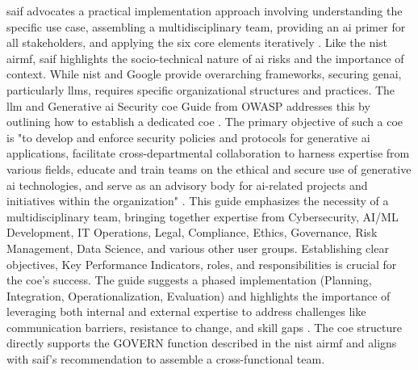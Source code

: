 \gls{saif} advocates a practical implementation approach involving understanding the specific use case, assembling a multidisciplinary team, providing an \gls{ai} primer for all stakeholders, and applying the six core elements iteratively \cite{hansen_introducing_2023}. Like the \gls{nist} \gls{airmf}, \gls{saif} highlights the socio-technical nature of \gls{ai} risks and the importance of context.
While \gls{nist} and Google provide overarching frameworks, securing \gls{genai}, particularly \glspl{llm}, requires specific organizational structures and practices. The \gls{llm} and Generative \gls{ai} Security \gls{coe} Guide from OWASP addresses this by outlining how to establish a dedicated \gls{coe} \cite{editor_llm_nodate-1}. The primary objective of such a \gls{coe} is "to develop and enforce security policies and protocols for generative \gls{ai} applications, facilitate cross-departmental collaboration to harness expertise from various fields, educate and train teams on the ethical and secure use of generative \gls{ai} technologies, and serve as an advisory body for \gls{ai}-related projects and initiatives within the organization" \cite[p.4]{editor_llm_nodate-1}. This guide emphasizes the necessity of a multidisciplinary team, bringing together expertise from Cybersecurity, AI/ML Development, IT Operations, Legal, Compliance, Ethics, Governance, Risk Management, Data Science, and various other user groups\cite{editor_llm_nodate-1}. Establishing clear objectives, Key Performance Indicators, roles, and responsibilities is crucial for the \gls{coe}'s success. The guide suggests a phased implementation (Planning, Integration, Operationalization, Evaluation) and highlights the importance of leveraging both internal and external expertise to address challenges like communication barriers, resistance to change, and skill gaps \cite{editor_llm_nodate-1}. The \gls{coe} structure directly supports the GOVERN function described in the \gls{nist} \gls{airmf} and aligns with \gls{saif}'s recommendation to assemble a cross-functional team.
